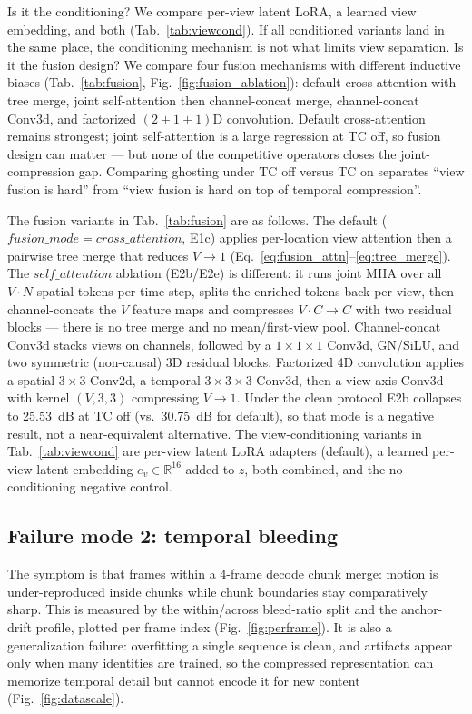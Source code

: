 Is it the conditioning? We compare per-view latent LoRA, a learned view embedding, and both (Tab.~\ref{tab:viewcond}). If all conditioned variants land in the same place, the conditioning mechanism is not what limits view separation. Is it the fusion design? We compare four fusion mechanisms with different inductive biases (Tab.~\ref{tab:fusion}, Fig.~\ref{fig:fusion_ablation}): default cross-attention with tree merge, joint self-attention then channel-concat merge, channel-concat Conv3d, and factorized $(2{+}1{+}1)$D convolution. Default cross-attention remains strongest; joint self-attention is a large regression at TC off, so fusion design can matter --- but none of the competitive operators closes the joint-compression gap. Comparing ghosting under TC off versus TC on separates ``view fusion is hard'' from ``view fusion is hard on top of temporal compression''.

The fusion variants in Tab.~\ref{tab:fusion} are as follows. The default ($fusion\_mode{=}cross\_attention$, E1c) applies per-location view attention then a pairwise tree merge that reduces $V{\to}1$ (Eq.~\ref{eq:fusion_attn}--\ref{eq:tree_merge}). The $self\_attention$ ablation (E2b/E2e) is different: it runs joint MHA over all $V{\cdot}N$ spatial tokens per time step, splits the enriched tokens back per view, then channel-concats the $V$ feature maps and compresses $V{\cdot}C{\to}C$ with two residual blocks --- there is no tree merge and no mean/first-view pool. Channel-concat Conv3d stacks views on channels, followed by a $1{\times}1{\times}1$ Conv3d, GN/SiLU, and two symmetric (non-causal) 3D residual blocks. Factorized 4D convolution applies a spatial $3{\times}3$ Conv2d, a temporal $3{\times}3{\times}3$ Conv3d, then a view-axis Conv3d with kernel $(V,3,3)$ compressing $V{\to}1$. Under the clean protocol E2b collapses to 25.53~dB at TC off (vs.\ 30.75~dB for default), so that mode is a negative result, not a near-equivalent alternative. The view-conditioning variants in Tab.~\ref{tab:viewcond} are per-view latent LoRA adapters (default), a learned per-view latent embedding $e_v\in\mathbb{R}^{16}$ added to $z$, both combined, and the no-conditioning negative control.



\subsection{Failure mode 2: temporal bleeding}

The symptom is that frames within a 4-frame decode chunk merge: motion is under-reproduced inside chunks while chunk boundaries stay comparatively sharp. This is measured by the within/across bleed-ratio split and the anchor-drift profile, plotted per frame index (Fig.~\ref{fig:perframe}). It is also a generalization failure: overfitting a single sequence is clean, and artifacts appear only when many identities are trained, so the compressed representation can memorize temporal detail but cannot encode it for new content (Fig.~\ref{fig:datascale}).


